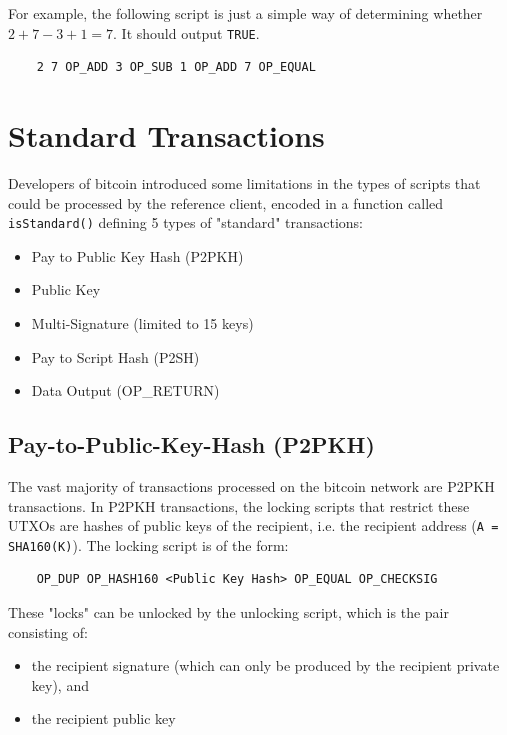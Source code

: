 \documentclass{article}
\begin{document}
    For example, the following script is just a simple way of determining whether $2+7-3+1=7$. It should output \texttt{TRUE}.

    \begin{lstlisting}
    2 7 OP_ADD 3 OP_SUB 1 OP_ADD 7 OP_EQUAL
    \end{lstlisting}

\section{Standard Transactions}

    Developers of bitcoin introduced some limitations in the types of scripts that could be processed by the reference client, encoded in a function called \texttt{isStandard()} defining 5 types of "standard" transactions:

    \begin{itemize}
      \item Pay to Public Key Hash (P2PKH)
      \item Public Key
      \item Multi-Signature (limited to 15 keys)
      \item Pay to Script Hash (P2SH)
      \item Data Output (OP\_RETURN)
    \end{itemize}

  \subsection{Pay-to-Public-Key-Hash (P2PKH)}

    The vast majority of transactions processed on the bitcoin network are P2PKH transactions. In P2PKH transactions, the locking scripts that restrict these UTXOs are hashes of public keys of the recipient, i.e. the recipient address (\texttt{A = SHA160(K)}). The locking script is of the form:

    \begin{lstlisting}
    OP_DUP OP_HASH160 <Public Key Hash> OP_EQUAL OP_CHECKSIG
    \end{lstlisting}

    These "locks" can be unlocked by the unlocking script, which is the pair consisting of:

    \begin{itemize}
      \item the recipient signature (which can only be produced by the recipient private key), and
      \item the recipient public key
    \end{itemize}
\end{document}
